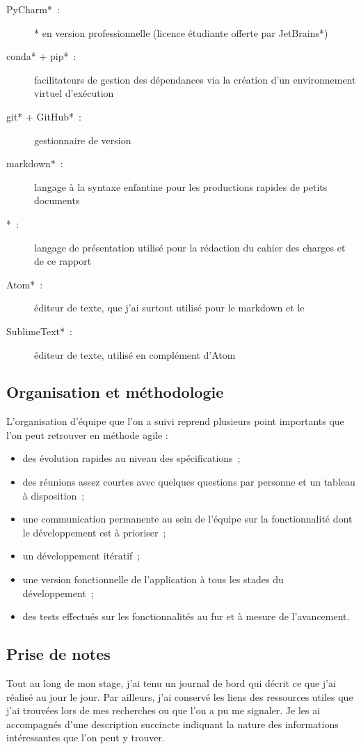 \begin{description}
  \item[\gls{PyCharm}*~:] * en version professionnelle (licence étudiante offerte par \gls{JetBrains}*)
  \item[\gls{conda}* + \gls{pip}*~:] facilitateurs de gestion des dépendances via la création d'un environnement virtuel d'exécution
  \item[\gls{git}* + \gls{GitHub}*~:] gestionnaire de version
  \item[\gls{markdown}*~:] langage à la syntaxe enfantine pour les productions rapides de petits documents
  \item[*~:] langage de présentation utilisé pour la rédaction du cahier des charges et de ce rapport
  \item[\gls{Atom}*~:] éditeur de texte, que j'ai surtout utilisé pour le markdown et le 
  \item[\gls{SublimeText}*~:] éditeur de texte, utilisé en complément d'Atom
\end{description}

  \subsection{Organisation et méthodologie}

L'organisation d'équipe que l'on a suivi reprend plusieurs point importants que l'on peut retrouver en méthode agile :

\begin{itemize}
  \item des évolution rapides au niveau des spécifications~;
  \item des réunions  assez courtes avec quelques questions par personne et un tableau à disposition~;
  \item une communication permanente au sein de l'équipe sur la fonctionnalité dont le développement est à prioriser~;
  \item un développement itératif~;
  \item une version fonctionnelle de l'application à tous les stades du développement~;
  \item des tests effectués sur les fonctionnalités au fur et à mesure de l'avancement.
\end{itemize}

  \subsection{Prise de notes}

Tout au long de mon stage, j'ai tenu un journal de bord qui décrit ce que j'ai réalisé au jour le jour. Par ailleurs, j'ai conservé les liens des ressources utiles que j'ai trouvées lors de mes recherches ou que l'on a pu me signaler. Je les ai accompagnés d'une description succincte indiquant la nature des informations intéressantes que l'on peut y trouver.
